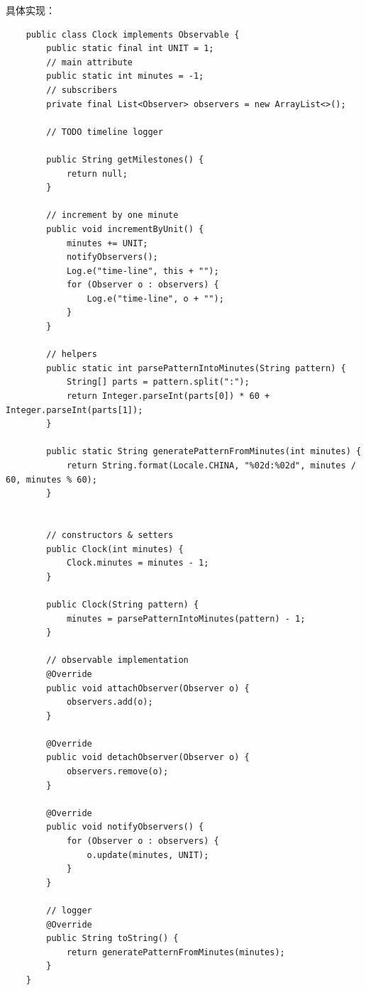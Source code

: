 \documentclass[12pt, a4paper, UTF8]{ctexart}
\begin{document}
具体实现：
\begin{verbatim}
    public class Clock implements Observable {
        public static final int UNIT = 1;
        // main attribute
        public static int minutes = -1;
        // subscribers
        private final List<Observer> observers = new ArrayList<>();

        // TODO timeline logger

        public String getMilestones() {
            return null;
        }

        // increment by one minute
        public void incrementByUnit() {
            minutes += UNIT;
            notifyObservers();
            Log.e("time-line", this + "");
            for (Observer o : observers) {
                Log.e("time-line", o + "");
            }
        }

        // helpers
        public static int parsePatternIntoMinutes(String pattern) {
            String[] parts = pattern.split(":");
            return Integer.parseInt(parts[0]) * 60 + Integer.parseInt(parts[1]);
        }

        public static String generatePatternFromMinutes(int minutes) {
            return String.format(Locale.CHINA, "%02d:%02d", minutes / 60, minutes % 60);
        }


        // constructors & setters
        public Clock(int minutes) {
            Clock.minutes = minutes - 1;
        }

        public Clock(String pattern) {
            minutes = parsePatternIntoMinutes(pattern) - 1;
        }

        // observable implementation
        @Override
        public void attachObserver(Observer o) {
            observers.add(o);
        }

        @Override
        public void detachObserver(Observer o) {
            observers.remove(o);
        }

        @Override
        public void notifyObservers() {
            for (Observer o : observers) {
                o.update(minutes, UNIT);
            }
        }

        // logger
        @Override
        public String toString() {
            return generatePatternFromMinutes(minutes);
        }
    }

\end{verbatim}

\newpage
\end{document}
